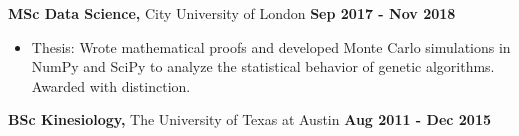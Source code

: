 \documentclass [
        11pt
] {article}
\begin{document}
\vspace*{10pt}

\noindent \textbf {MSc Data Science,} City University of London
\hspace*{\fill} \textbf{Sep 2017 - Nov 2018}

\begin{itemize}[noitemsep,topsep=0pt]
\renewcommand{\labelitemi}{\scriptsize$\blacksquare$}
\item Thesis: Wrote mathematical proofs and developed Monte Carlo simulations
in NumPy and SciPy to analyze the statistical behavior of genetic algorithms.
Awarded with distinction.
\end{itemize}

\noindent \textbf {BSc Kinesiology,} The University of Texas at Austin
\hspace*{\fill} \textbf{Aug 2011 - Dec 2015}
\end{document}
